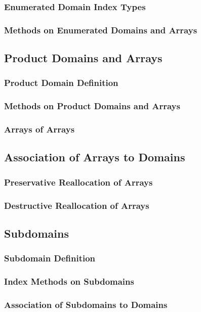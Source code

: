 \documentclass[10pt,twoside,titlepage]{article}
\begin{document}
\subsubsection{Enumerated Domain Index Types}
\subsubsection{Methods on Enumerated Domains and Arrays}
\subsection{Product Domains and Arrays}
\subsubsection{Product Domain Definition}
\subsubsection{Methods on Product Domains and Arrays}
\subsubsection{Arrays of Arrays}
\subsection{Association of Arrays to Domains}
\subsubsection{Preservative Reallocation of Arrays}
\subsubsection{Destructive Reallocation of Arrays}
\subsection{Subdomains}
\subsubsection{Subdomain Definition}
\subsubsection{Index Methods on Subdomains}
\subsubsection{Association of Subdomains to Domains}
\end{document}
